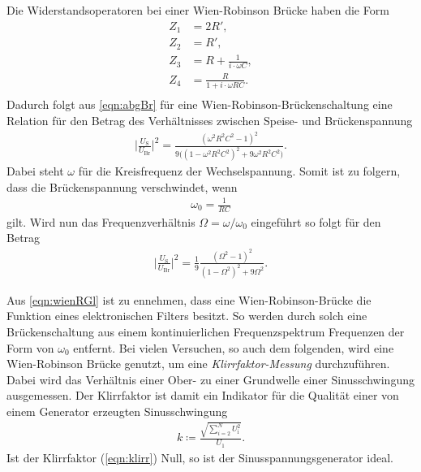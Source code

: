 \sloppy
Die Widerstandsoperatoren bei einer Wien-Robinson Brücke haben die Form
\begin{align*}
    Z_1 &= 2R', \\
    Z_2 &= R' , \\
    Z_3 &= R + \frac{1}{i\cdot\omega C} , \\
    Z_4 &= \frac{R}{1+i\cdot\omega RC} . \\
\end{align*}
Dadurch folgt aus \autoref{eqn:abgBr} für eine Wien-Robinson-Brückenschaltung eine Relation für den Betrag des Verhältnisses
zwischen Speise- und Brückenspannung
\begin{align}
    \Big|\frac{U_{\text{S}}}{U_{\text{Br}}}\Big|^2 = \frac{(\omega^2 R^2C^2-1)^2}{9\Big((1-\omega^2R^2C^2)^2 + 9\omega^2R^2C^2\Big)}.
    \label{eqn:theo}
\end{align}
Dabei steht $\omega$ für die Kreisfrequenz der Wechselspannung.
Somit ist zu folgern, dass die Brückenspannung verschwindet, wenn 
\begin{align*}
    \omega_0 = \frac{1}{RC}
\end{align*}
gilt. Wird nun das Frequenzverhältnis $\Omega = \omega/\omega_0$ eingeführt so folgt für den Betrag
\begin{align}
    \Big|\frac{U_{\text{S}}}{U_{\text{Br}}}\Big|^2 = \frac 19 \frac{(\Omega^2-1)^2}{(1-\Omega^2)^2+9\Omega^2}.
    \label{eqn:wienRGl}
\end{align}

Aus \autoref{eqn:wienRGl} ist zu ennehmen, dass eine Wien-Robinson-Brücke die Funktion eines elektronischen Filters besitzt.
So werden durch solch eine Brückenschaltung aus einem kontinuierlichen Frequenzspektrum Frequenzen der Form von $\omega_0$
entfernt. 
Bei vielen Versuchen, so auch dem folgenden, wird eine Wien-Robinson Brücke genutzt, um eine \textit{Klirrfaktor-Messung}
durchzuführen. Dabei wird das Verhältnis einer Ober- zu einer Grundwelle einer Sinusschwingung ausgemessen. Der Klirrfaktor
ist damit ein Indikator für die Qualität einer von einem Generator erzeugten Sinusschwingung
\begin{align}
    k \coloneq \frac{\sqrt{\sum_{i=2}^N U_{\text{i}}^2}}{U_1}.
    \label{eqn:klirr}
\end{align}
Ist der Klirrfaktor (\ref{eqn:klirr}) Null, so ist der Sinusspannungsgenerator ideal.